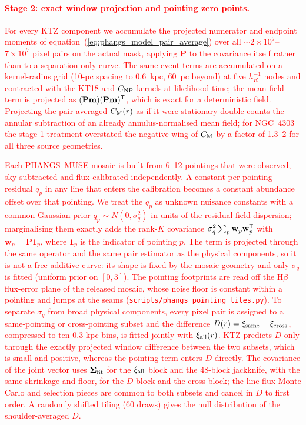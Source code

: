\documentclass[fleqn,usenatbib]{mnras}
\newcommand{\revadd}[1]{\textcolor{red}{#1}}
\begin{document}
\revadd{\paragraph*{Stage 2: exact window projection and pointing zero points.}  For every KTZ component we accumulate the projected numerator and endpoint moments of equation~(\ref{eq:phangs_model_pair_average}) over all $\sim2\times10^7$--$7\times10^7$ pixel pairs on the actual mask, applying $\mathbf P$ to the covariance itself rather than to a separation-only curve.  The same-event terms are accumulated on a kernel-radius grid (10-pc spacing to 0.6~kpc, 60~pc beyond) at five $h_R^{-1}$ nodes and contracted with the KT18 and $C_{\rm NP}$ kernels at likelihood time; the mean-field term is projected as $(\mathbf P\mathbf m)(\mathbf P\mathbf m)^{\sf T}$, which is exact for a deterministic field.  Projecting the pair-averaged $C_{\rm M}(r)$ as if it were stationary double-counts the annular subtraction of an already annulus-normalised mean field; for NGC~4303 the stage-1 treatment overstated the negative wing of $C_{\rm M}$ by a factor of 1.3--2 for all three source geometries.}

\revadd{Each PHANGS--MUSE mosaic is built from 6--12 pointings that were observed, sky-subtracted and flux-calibrated independently.  A constant per-pointing residual $q_p$ in any line that enters the calibration becomes a constant abundance offset over that pointing.  We treat the $q_p$ as unknown nuisance constants with a common Gaussian prior $q_p\sim N(0,\sigma_q^2)$ in units of the residual-field dispersion; marginalising them exactly adds the rank-$K$ covariance $\sigma_q^2\sum_p\mathbf w_p\mathbf w_p^{\sf T}$ with $\mathbf w_p=\mathbf P\mathbf 1_p$, where $\mathbf 1_p$ is the indicator of pointing $p$.  The term is projected through the same operator and the same pair estimator as the physical components, so it is not a free additive curve: its shape is fixed by the mosaic geometry and only $\sigma_q$ is fitted (uniform prior on $[0,3]$).  The pointing footprints are read off the H$\beta$ flux-error plane of the released mosaic, whose noise floor is constant within a pointing and jumps at the seams (\texttt{scripts/phangs\_pointing\_tiles.py}).  To separate $\sigma_q$ from broad physical components, every pixel pair is assigned to a same-pointing or cross-pointing subset and the difference $D(r)=\xi_{\rm same}-\xi_{\rm cross}$, compressed to ten 0.3-kpc bins, is fitted jointly with $\xi_{\rm all}(r)$.  KTZ predicts $D$ only through the exactly projected window difference between the two subsets, which is small and positive, whereas the pointing term enters $D$ directly.  The covariance of the joint vector uses $\boldsymbol\Sigma_{\rm fit}$ for the $\xi_{\rm all}$ block and the 48-block jackknife, with the same shrinkage and floor, for the $D$ block and the cross block; the line-flux Monte Carlo and selection pieces are common to both subsets and cancel in $D$ to first order.  A randomly shifted tiling (60 draws) gives the null distribution of the shoulder-averaged $D$.}
\end{document}
